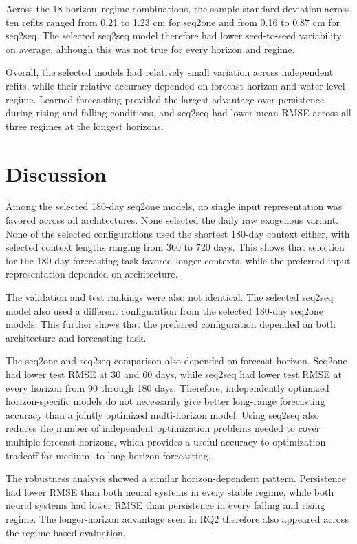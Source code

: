 \documentclass[conference]{IEEEtran}
\begin{document}
Across the 18 horizon--regime combinations, the sample standard deviation across ten refits ranged from 0.21 to 1.23 cm for seq2one and from 0.16 to 0.87 cm for seq2seq. The selected seq2seq model therefore had lower seed-to-seed variability on average, although this was not true for every horizon and regime.

Overall, the selected models had relatively small variation across independent refits, while their relative accuracy depended on forecast horizon and water-level regime. Learned forecasting provided the largest advantage over persistence during rising and falling conditions, and seq2seq had lower mean RMSE across all three regimes at the longest horizons.


\section{Discussion}

Among the selected 180-day seq2one models, no single input representation was favored across all architectures. None selected the daily raw exogenous variant. None of the selected configurations used the shortest 180-day context either, with selected context lengths ranging from 360 to 720 days. This shows that selection for the 180-day forecasting task favored longer contexts, while the preferred input representation depended on architecture.

The validation and test rankings were also not identical. The selected seq2seq model also used a different configuration from the selected 180-day seq2one models. This further shows that the preferred configuration depended on both architecture and forecasting task.

The seq2one and seq2seq comparison also depended on forecast horizon. Seq2one had lower test RMSE at 30 and 60 days, while seq2seq had lower test RMSE at every horizon from 90 through 180 days. Therefore, independently optimized horizon-specific models do not necessarily give better long-range forecasting accuracy than a jointly optimized multi-horizon model. Using seq2seq also reduces the number of independent optimization problems needed to cover multiple forecast horizons, which provides a useful accuracy-to-optimization tradeoff for medium- to long-horizon forecasting.

The robustness analysis showed a similar horizon-dependent pattern. Persistence had lower RMSE than both neural systems in every stable regime, while both neural systems had lower RMSE than persistence in every falling and rising regime. The longer-horizon advantage seen in RQ2 therefore also appeared across the regime-based evaluation.
\end{document}
